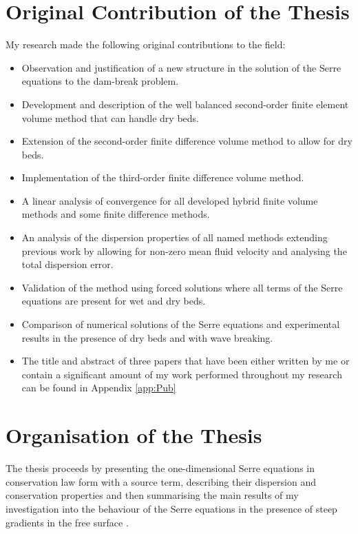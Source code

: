 \section{Original Contribution of the Thesis}

My research made the following original contributions to the field:
\begin{itemize}
	\item Observation and justification of a new structure in the solution of the Serre equations to the dam-break problem.
	\item Development and description of the well balanced second-order finite element volume method that can handle dry beds.
	\item Extension of the second-order finite difference volume method to allow for dry beds.
	\item Implementation of the third-order finite difference volume method.
	\item A linear analysis of convergence for all developed hybrid finite volume methods and some finite difference methods.
	\item An analysis of the dispersion properties of all named methods extending previous work by allowing for non-zero mean fluid velocity and analysing the total dispersion error.
	\item Validation of the method using forced solutions where all terms of the Serre equations are present for wet and dry beds.
	\item Comparison of numerical solutions of the Serre equations and experimental results in the presence of dry beds and with wave breaking. 
	\item The title and abstract of three papers that have been either written by me or contain a significant amount of my work performed throughout my research can be found in Appendix \ref{app:Pub}
\end{itemize}



\section{Organisation of the Thesis}
The thesis proceeds by presenting the one-dimensional Serre equations in conservation law form with a source term, describing their dispersion and conservation properties and then summarising the main results of my investigation into the behaviour of the Serre equations in the presence of steep gradients in the free surface \cite{Pitt-2018-61}.

